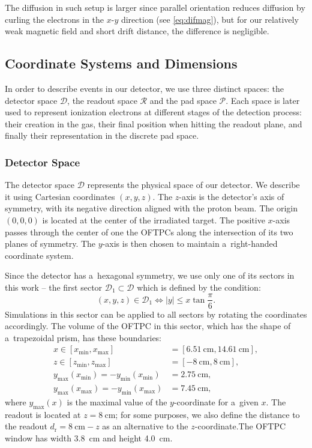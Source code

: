 			The diffusion in such setup is larger since parallel orientation reduces diffusion by curling the electrons in the $x$\nobreakdash-$y$ direction (see \cref{eq:difmag}), but for our relatively weak magnetic field and short drift distance, the difference is negligible.
	
		\subsection{Coordinate Systems and Dimensions}
		\label{sec:coor}
			In order to describe events in our detector, we use three distinct spaces: the detector space $\mathcal{D}$, the readout space $\mathcal{R}$ and the pad space $\mathcal{P}$. Each space is later used to represent ionization electrons at different stages of the detection process: their creation in the gas, their final position when hitting the readout plane, and finally their representation in the discrete pad space.
		
			\subsubsection{Detector Space}
				The detector space $\mathcal{D}$ represents the physical space of our detector. We describe it using Cartesian coordinates $(x,y,z)$. The $z$-axis is the detector's axis of symmetry, with its negative direction aligned with the proton beam. The origin $(0,0,0)$ is located at the center of the irradiated target. The positive $x$\nobreakdash-axis passes through the center of one the \acp{OFTPC} along the intersection of its two planes of symmetry. The $y$\nobreakdash-axis is then chosen to maintain a~right-handed coordinate system.
				
				Since the detector has a~hexagonal symmetry, we use only one of its sectors in this work -- the first sector $\mathcal{D}_1 \subset \mathcal{D}$ which is defined by the condition:
					\begin{equation}
						(x,y,z) \in \mathcal{D}_1 \Leftrightarrow |y| \leq x\tan \frac{\pi}{6}.
					\end{equation}
				Simulations in this sector can be applied to all sectors by rotating the coordinates accordingly. The volume of the \ac{OFTPC} in this sector, which has the shape of a~trapezoidal prism, has these boundaries:
					\begin{align}
						x \in [x_\text{min},x_\text{max}] &= [\qty{6.51}{\cm},\qty{14.61}{\cm}],\\
						z \in [z_\text{min},z_\text{max}] &= [\qty{-8}{\cm},\qty{8}{\cm}],\\
						y_\text{max}(x_\text{min}) = -y_\text{min}(x_\text{min}) &= \qty{2.75}{\cm},\\
						y_\text{max}(x_\text{max}) = -y_\text{min}(x_\text{max}) &= \qty{7.45}{\cm},
					\end{align}
				where $y_\text{max}(x)$ is the maximal value of the $y$-coordinate for a~given $x$. The readout is located at $z = \qty{8}{\cm}$; for some purposes, we also define the distance to the readout $d_\text{r} = \qty{8}{\cm}-z$ as an alternative to the $z$-coordinate.The \ac{OFTPC} window has width \qty{3.8}{\cm} and height \qty{4.0}{\cm}.
				
